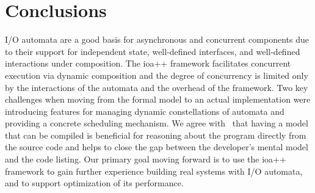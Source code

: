 \section{Conclusions\label{conclusion}}

I/O automata are a good basis for asynchronous and concurrent components due to their support for independent state, well-defined interfaces, and well-defined interactions under composition.
The ioa++ framework facilitates concurrent execution via dynamic composition and the degree of concurrency is limited only by the interactions of the automata and the overhead of the framework.
Two key challenges when moving from the formal model to an actual implementation were introducing features for managing dynamic constellations of automata and providing a concrete scheduling mechanism.
We agree with~\cite{georgiou2009automated} that having a model that can be compiled is beneficial for reasoning about the program directly from the source code and helps to close the gap between the developer's mental model and the code listing.
Our primary goal moving forward is to use the ioa++ framework to gain further experience building real systems with I/O automata, and to support optimization of its performance.


